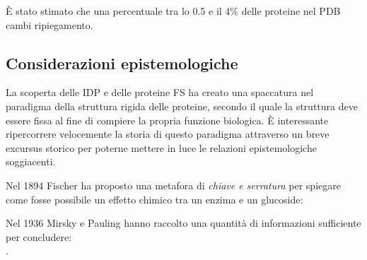 {{È stato stimato che una percentuale tra lo 0.5 e il 4\% delle proteine nel PDB cambi ripiegamento\supercite{porter2018extant}.

}
\subsection{Considerazioni epistemologiche}
La scoperta delle IDP e delle proteine FS ha creato una spaccatura nel paradigma della struttura rigida delle proteine, secondo il quale la struttura deve essere fissa al fine di compiere la propria funzione biologica. È interessante ripercorrere velocemente la storia di questo paradigma attraverso un breve excursus storico per poterne mettere in luce le relazioni epistemologiche soggiacenti.

\par Nel 1894 Fischer ha proposto una metafora di \textit{chiave e serratura }per spiegare come fosse possibile un effetto chimico tra un enzima e un glucoside: \\

\par Nel 1936 Mirsky e Pauling hanno raccolto una quantità di informazioni sufficiente per concludere:\\
.

}
